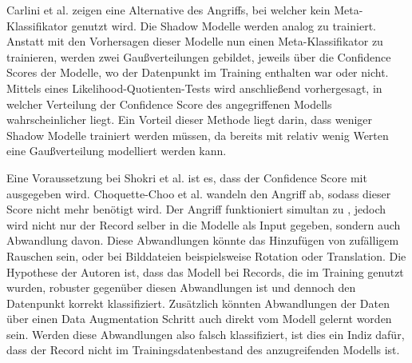 Carlini et al. \cite{P-13} zeigen eine Alternative des Angriffs, bei welcher kein Meta-Klassifikator genutzt wird.
Die Shadow Modelle werden analog zu \cite{P-2} trainiert. 
Anstatt mit den Vorhersagen dieser Modelle nun einen Meta-Klassifikator zu trainieren, werden zwei Gaußverteilungen gebildet, jeweils über die Confidence Scores der Modelle, wo der Datenpunkt im Training enthalten war oder nicht.
Mittels eines Likelihood-Quotienten-Tests wird anschließend vorhergesagt, in welcher Verteilung der Confidence Score des angegriffenen Modells wahrscheinlicher liegt.
Ein Vorteil dieser Methode liegt darin, dass weniger Shadow Modelle trainiert werden müssen, da bereits mit relativ wenig Werten eine Gaußverteilung modelliert werden kann.


Eine Voraussetzung bei Shokri et al. \cite{P-2} ist es, dass der Confidence Score mit ausgegeben wird.
Choquette-Choo et al. \cite{P-7} wandeln den Angriff ab, sodass dieser Score nicht mehr benötigt wird.
Der Angriff funktioniert simultan zu \cite{P-2}, jedoch wird nicht nur der Record selber in die Modelle als Input gegeben, sondern auch Abwandlung davon. 
Diese Abwandlungen könnte das Hinzufügen von zufälligem Rauschen sein, oder bei Bilddateien beispielsweise Rotation oder Translation.
Die Hypothese der Autoren ist, dass das Modell bei Records, die im Training genutzt wurden, robuster gegenüber diesen Abwandlungen ist und dennoch den Datenpunkt korrekt klassifiziert.
Zusätzlich könnten Abwandlungen der Daten über einen Data Augmentation Schritt auch direkt vom Modell gelernt worden sein.
Werden diese Abwandlungen also falsch klassifiziert, ist dies ein Indiz dafür, dass der Record nicht im Trainingsdatenbestand des anzugreifenden Modells ist.

